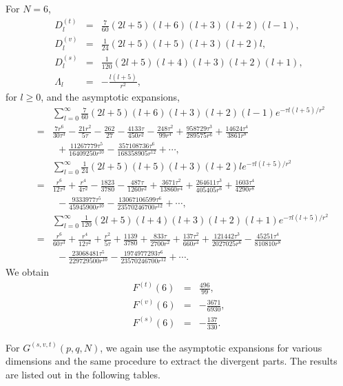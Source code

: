 \documentclass[a4paper,aps,preprint,groupedaddress,showpacs]{revtex4}
\begin{document}
For $N=6$,
\begin{eqnarray}
D^{(t)}_{l}&=&\frac{7}{60}(2l+5)(l+6)(l+3)(l+2)(l-1),
\\
D^{(v)}_{l}&=&\frac{1}{24}(2l+5)(l+5)(l+3)(l+2)l,
\\
D^{(s)}_{l}&=&\frac{1}{120}(2l+5)(l+4)(l+3)(l+2)(l+1),
\\
\Lambda_{l}&=&-\frac{l(l+5)}{r^{2}},
\end{eqnarray}
for $l\geq 0$, and the asymptotic expansions,
\begin{eqnarray}
&&\sum^{\infty}_{l=0}
\frac{7}{60}(2l+5)(l+6)(l+3)(l+2)(l-1)
e^{-\tau l(l+5)/r^{2}}
\nonumber\\
&=&\frac{7r^{6}}{30\tau^{3}}-\frac{21r^{2}}{5\tau}-
\frac{262}{27}-\frac{4133\tau}{450r^{2}}-
\frac{248\tau^{2}}{99r^{4}}+
\frac{958729\tau^{3}}{289575r^{6}}+
\frac{14624\tau^{4}}{3861r^{8}}
\nonumber\\
&&\ \ 
+\frac{11267779\tau^{5}}{16409250r^{10}}-
\frac{357108736\tau^{6}}{168358905r^{12}}+\cdots,
\\
&&\sum^{\infty}_{l=0}\frac{1}{24}(2l+5)(l+5)(l+3)(l+2)l
e^{-\tau l(l+5)/r^{2}}
\nonumber\\
&=&\frac{r^{6}}{12\tau^{3}}+
\frac{r^{4}}{4\tau^{2}}-
\frac{1823}{3780}-
\frac{487\tau}{1260r^{2}}+
\frac{3671\tau^{2}}{13860r^{4}}+
\frac{264611\tau^{3}}{405405r^{6}}+
\frac{1603\tau^{4}}{4290r^{8}}
\nonumber\\
&&\ \ -\frac{9333977\tau^{5}}{45945900r^{10}}-
\frac{13067106599\tau^{6}}{23570246700r^{12}}+\cdots,
\\
&&\sum^{\infty}_{l=0}\frac{1}{120}(2l+5)(l+4)(l+3)(l+2)(l+1)
e^{-\tau l(l+5)/r^{2}}
\nonumber\\
&=&\frac{r^{6}}{60\tau^{3}}+
\frac{r^{4}}{12\tau^{2}}+
\frac{r^{2}}{5\tau}+
\frac{1139}{3780}+
\frac{833\tau}{2700r^{2}}+
\frac{137\tau^{2}}{660r^{4}}+
\frac{121442\tau^{3}}{2027025r^{6}}-
\frac{45251\tau^{4}}{810810r^{8}}
\nonumber\\
&&\ \ -\frac{23068481\tau^{5}}{229729500r^{10}}-
\frac{1974977293\tau^{6}}{23570246700r^{12}}+\cdots.
\end{eqnarray}
We obtain
\begin{eqnarray}
F^{(t)}(6)&=&\frac{496}{99},
\\
F^{(v)}(6)&=&-\frac{3671}{6930},
\\
F^{(s)}(6)&=&-\frac{137}{330}.
\end{eqnarray}

For $G^{(s,v,t)}(p,q,N)$, we again use the asymptotic expansions 
for various dimensions and the same procedure to extract the 
divergent parts. The results are listed out in the following
tables.
\end{document}
